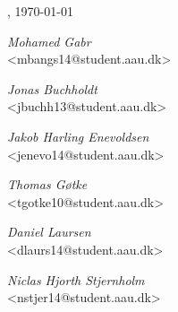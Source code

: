 \vspace{\baselineskip}\hfill \AAU, \today
\vfill\noindent
\begin{center}
\begin{minipage}[b]{0.45\textwidth}
 \centering
  \textit{Mohamed Gabr}\\
 {\footnotesize <mbangs14@student.aau.dk>}
\end{minipage}
\hspace{0.3cm}
\begin{minipage}[b]{0.45\textwidth}
 \centering
  \textit{Jonas Buchholdt}\\
 {\footnotesize <jbuchh13@student.aau.dk>}
\end{minipage}
\end{center}
\vspace{1\baselineskip}
\begin{center}
\begin{minipage}[b]{0.45\textwidth}
 \centering
  \textit{Jakob Harling Enevoldsen}\\
 {\footnotesize <jenevo14@student.aau.dk>}
\end{minipage}
\hspace{0.3cm}
\begin{minipage}[b]{0.45\textwidth}
 \centering
  \textit{Thomas Gøtke}\\
 {\footnotesize <tgotke10@student.aau.dk>}
\end{minipage}
\end{center}
\vspace{1\baselineskip}
\begin{center}
\begin{minipage}[b]{0.45\textwidth}
 \centering
  \textit{Daniel Laursen}\\
 {\footnotesize <dlaurs14@student.aau.dk>}
\end{minipage}
\hspace{0.3cm}
\begin{minipage}[b]{0.45\textwidth}
 \centering
  \textit{Niclas Hjorth Stjernholm}\\
 {\footnotesize <nstjer14@student.aau.dk>}
\end{minipage}
\end{center}
